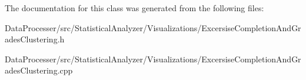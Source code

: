 The documentation for this class was generated from the following files\+:\begin{DoxyCompactItemize}
\item 
Data\+Processer/src/\+Statistical\+Analyzer/\+Visualizations/Excersise\+Completion\+And\+Grades\+Clustering.\+h\item 
Data\+Processer/src/\+Statistical\+Analyzer/\+Visualizations/Excersise\+Completion\+And\+Grades\+Clustering.\+cpp\end{DoxyCompactItemize}
